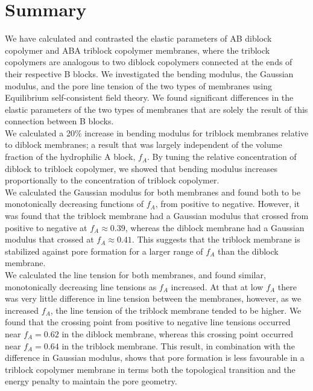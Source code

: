 \documentclass[twocolumn,aps,floatfix,nobibnotes]{revtex4-1}
\begin{document}
\section{Summary}
\label{sec:summary}

We have calculated and contrasted the elastic parameters of AB diblock copolymer and ABA triblock copolymer membranes, where the triblock copolymers are analogous to two diblock copolymers connected at the ends of their respective B blocks. We investigated the bending modulus, the Gaussian modulus, and the pore line tension of the two types of membranes using Equilibrium self-consistent field theory. We found significant differences in the elastic parameters of the two types of membranes that are solely the result of this connection between B blocks. \\
\indent We calculated a 20$\%$ increase in bending modulus for triblock membranes relative to diblock membranes; a result that was largely independent of the volume fraction of the hydrophilic A block, $f_A$. By tuning the relative concentration of diblock to triblock copolymer, we showed that bending modulus increases proportionally to the concentration of triblock copolymer.  \\
\indent We calculated the Gaussian modulus for both membranes and found both to be monotonically decreasing functions of $f_A$, from positive to negative. However, it was found that the triblock membrane had a Gaussian modulus that crossed from positive to negative at $f_A \approx 0.39$, whereas the diblock membrane had a Gaussian modulus that crossed at $f_A \approx 0.41$. This suggests that the triblock membrane is stabilized against pore formation for a larger range of $f_A$ than the diblock membrane. \\
\indent We calculated the line tension for both membranes, and found similar, monotonically decreasing line tensions as $f_A$ increased. At that at low $f_A$ there was very little difference in line tension between the membranes, however, as we increased $f_A$, the line tension of the triblock membrane tended to be higher. We found that the crossing point from positive to negative line tensions occurred near $f_A = 0.62$ in the diblock membrane, whereas this crossing point occurred near $f_A = 0.64$ in the triblock membrane. This result, in combination with the difference in Gaussian modulus,  shows that pore formation is less favourable in a triblock copolymer membrane in terms both the topological transition and the energy penalty to maintain the pore geometry. \\
\end{document}
